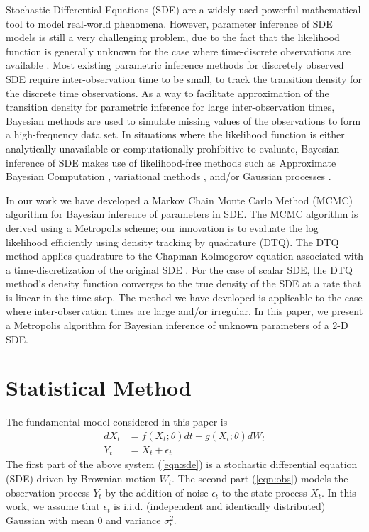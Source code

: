 \documentclass[wcp]{jmlr}
\begin{document}
Stochastic Differential Equations (SDE) are a widely used powerful mathematical tool to model real-world phenomena. However, parameter inference of SDE models is still a 
very challenging problem, due to the fact that the likelihood function is generally unknown for the case where time-discrete observations are available \citep{sorensen2004parametric, iacus2009simulation, fuchs2013inference}. Most existing parametric inference methods for discretely observed SDE require inter-observation time to be small, to track the transition density for the discrete time observations. As a way to facilitate approximation of the transition density for parametric inference for large inter-observation times, Bayesian methods are used to simulate missing values of the observations to form a high-frequency data set. In situations where the likelihood function is either analytically unavailable or computationally prohibitive to evaluate, Bayesian inference of SDE makes use of likelihood-free methods such as Approximate Bayesian Computation \citep{Picchini2014}, variational methods \citep{Archambeau2007a, Vrettas2015}, and/or Gaussian processes \citep{Archambeau2007, Ruttor2013}.


In our work we have developed a Markov Chain Monte Carlo Method (MCMC) algorithm for Bayesian inference of parameters in SDE.  The MCMC algorithm is derived using a Metropolis scheme; our innovation is to evaluate the log likelihood efficiently using density tracking by quadrature (DTQ).  The DTQ method applies quadrature to the Chapman-Kolmogorov equation associated with a time-discretization of the original SDE \citep{BhatMadu2016}. For the case of scalar SDE, the DTQ method's density function converges to the true density of the SDE at a rate that is linear in the time step.  The method we have developed is applicable to the case where inter-observation times are large and/or irregular.  In this paper, we present a Metropolis algorithm for Bayesian inference of unknown parameters of a 2-D SDE.

\section{Statistical Method}
\label{sect:methods}
The fundamental model considered in this paper is
\begin{subequations}
\label{eqn:sdefiltprob}
\begin{align}
\label{eqn:sde}
dX_t &= f(X_t; \theta) dt + g(X_t; \theta) dW_t \\
\label{eqn:obs}
Y_t &= X_t + \epsilon_t
\end{align}
\end{subequations}
The first part of the above system (\ref{eqn:sde}) is a stochastic differential
equation (SDE) driven by Brownian motion $W_t$.  The second part
(\ref{eqn:obs}) models the observation process $Y_t$ by the addition
of noise $\epsilon_t$ to the state process $X_t$.  In this work, we
assume that $\epsilon_t$ is i.i.d. (independent and identically
distributed) Gaussian with mean $0$ and variance $\sigma_\epsilon^2$.
\end{document}
